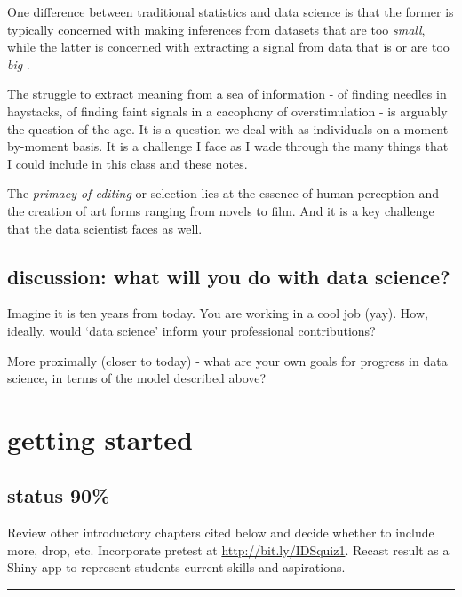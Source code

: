 \documentclass[
  openany]{book}
\begin{document}
One difference between traditional statistics and data science is that the former is typically concerned with making inferences from datasets that are too \emph{small}, while the latter is concerned with extracting a signal from data that is or are too \emph{big} \citep{donoho2015fifty}.

The struggle to extract meaning from a sea of information - of finding needles in haystacks, of finding faint signals in a cacophony of overstimulation - is arguably the question of the age. It is a question we deal with as individuals on a moment-by-moment basis. It is a challenge I face as I wade through the many things that I could include in this class and these notes.

The \emph{primacy of editing} or selection lies at the essence of human perception and the creation of art forms ranging from novels to film. And it is a key challenge that the data scientist faces as well.

\hypertarget{discussion-what-will-you-do-with-data-science}{%
\section{discussion: what will you do with data science?}\label{discussion-what-will-you-do-with-data-science}}

Imagine it is ten years from today. You are working in a cool job (yay). How, ideally, would `data science' inform your professional contributions?

More proximally (closer to today) - what are your own goals for progress in data science, in terms of the model described above?

\hypertarget{getting-started}{%
\chapter{getting started}\label{getting-started}}

\hypertarget{status-90-1}{%
\section*{status 90\%}\label{status-90-1}}

Review other introductory chapters cited below and decide whether to include more, drop, etc. Incorporate pretest at \url{http://bit.ly/IDSquiz1}. Recast result as a Shiny app to represent students current skills and aspirations.

\begin{center}\rule{0.5\linewidth}{\linethickness}\end{center}
\end{document}
